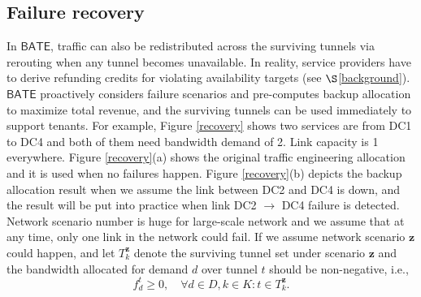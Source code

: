 \documentclass[sigconf]{acmart}
\begin{document}
\subsection{Failure recovery} \label{backup}
In $\mathsf{BATE}$,  traffic can also be redistributed across the surviving tunnels via rerouting when any tunnel becomes unavailable.
In reality, service providers have to derive refunding credits for violating availability targets (see $\S$\ref{background}).
$\mathsf{BATE}$ proactively considers failure scenarios and pre-computes backup allocation to maximize total revenue, and the surviving tunnels can be used immediately to support tenants.
For example, Figure \ref{recovery} shows two services are from DC1 to DC4 and both of them need bandwidth demand of 2.
Link capacity is 1 everywhere.
Figure \ref{recovery}(a) shows the original traffic engineering allocation and it is used when no failures happen.
Figure \ref{recovery}(b) depicts the backup allocation result when we assume the link between DC2 and DC4 is down, and the result will be put into practice when link DC2 $\to$ DC4 failure is detected.
Network scenario number is huge for large-scale network and we assume that at any time, only one link in the network could fail. 
If we assume network scenario $ \mathbf{z}$ could happen, and let 
$T^ { \mathbf{z}}_k$ denote the surviving tunnel set under scenario $ \mathbf{z}$ and the bandwidth allocated for demand $d$ over tunnel $t$ should be non-negative, i.e.,
\begin{equation}
f^{t}_{d} \ge 0, \quad\forall d \in D ,  k\in K : t\in T^{\mathbf{z}}_k.
\label{constraint-f3}
\end{equation}
\end{document}
